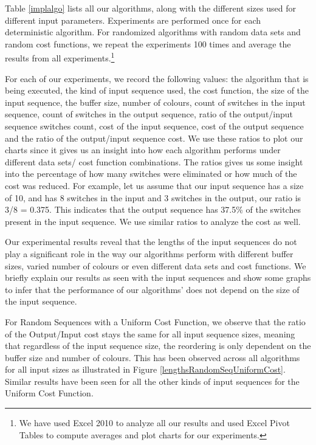 Table \ref{implalgo} lists all our algorithms, along with the different sizes used for different input parameters. Experiments are performed once for each deterministic algorithm. For randomized algorithms with random data sets and random cost functions, we repeat the experiments 100 times and average the results from all experiments.\footnote{We have used Excel 2010 to analyze all our results and used Excel Pivot Tables to compute averages and plot charts for our experiments.} 

For each of our experiments, we record the following values: the algorithm that is being executed, the kind of input sequence used, the cost function, the size of the input sequence, the buffer size, number of colours, count of switches in the input sequence, count of switches in the output sequence, ratio of the output/input sequence switches count, cost of the input sequence, cost of the output sequence and the ratio of the output/input sequence cost. We use these ratios to plot our charts since it gives us an insight into how each algorithm performs under different data sets/ cost function combinations. The ratios gives us some insight into the percentage of how many switches were eliminated or how much of the cost was reduced. For example, let us assume that our input sequence has a size of 10, and has 8 switches in the input and 3 switches in the output, our ratio is 3/8 = 0.375. This indicates that the output sequence has 37.5\% of the switches present in the input sequence. We use similar ratios to analyze the cost as well.

Our experimental results reveal that the lengths of the input sequences do not play a significant role in the way our algorithms perform with different buffer sizes, varied number of colours or even different data sets and cost functions. We briefly explain our results as seen with the input sequences and show some graphs to infer that the performance of our algorithms' does not depend on the size of the input sequence.

For Random Sequences with a Uniform Cost Function, we observe that the ratio of the Output/Input cost stays the same for all input sequence sizes, meaning that regardless of the input sequence size, the reordering is only dependent on the buffer size and number of colours. This has been observed across all algorithms for all input sizes as illustrated in Figure \ref{lengthsRandomSeqUniformCost}. Similar results have been seen for all the other kinds of input sequences for the Uniform Cost Function. 

